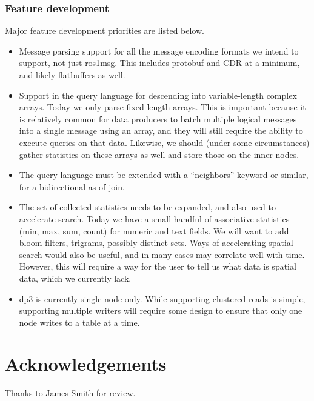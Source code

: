 \documentclass[9pt,twocolumn]{article}
\newcommand{\q}[1]{``#1''}
\begin{document}
    \subsubsection{Feature development}
    Major feature development priorities are listed below.
    \begin{itemize}
      \item Message parsing support for all the message encoding formats we
        intend to support, not just ros1msg. This includes protobuf and CDR at
        a minimum, and likely flatbuffers as well.
      \item Support in the query language for descending into variable-length
        complex arrays. Today we only parse fixed-length arrays. This is
        important because it is relatively common for data producers to batch
        multiple logical messages into a single message using an array, and
        they will still require the ability to execute queries on that data.
        Likewise, we should (under some circumstances) gather statistics on
        these arrays as well and store those on the inner nodes.
      \item The query language must be extended with a \q{neighbors} keyword or
        similar, for a bidirectional as-of join.
      \item The set of collected statistics needs to be expanded, and also used to
        accelerate search. Today we have a small handful of associative statistics
        (min, max, sum, count) for numeric and text fields. We will want to add
        bloom filters, trigrams, possibly distinct sets. Ways of accelerating
        spatial search would also be useful, and in many cases may correlate well
        with time. However, this will require a way for the user to tell us what
        data is spatial data, which we currently lack.
      \item dp3 is currently single-node only. While supporting clustered reads is
        simple, supporting multiple writers will require some design to ensure that
        only one node writes to a table at a time.
    \end{itemize}

    \section*{Acknowledgements}
    Thanks to James Smith for review.

    \printbibliography

  
\end{document}
